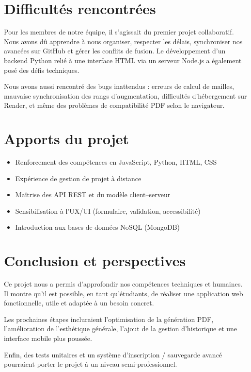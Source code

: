\documentclass{article}
\begin{document}
\section{Difficultés rencontrées}

Pour les membres de notre équipe, il s'agissait du premier projet collaboratif. Nous avons dû apprendre à nous organiser, respecter les délais, synchroniser nos avancées sur GitHub et gérer les conflits de fusion. Le développement d'un backend Python relié à une interface HTML via un serveur Node.js a également posé des défis techniques.

Nous avons aussi rencontré des bugs inattendus : erreurs de calcul de mailles, mauvaise synchronisation des rangs d'augmentation, difficultés d'hébergement sur Render, et même des problèmes de compatibilité PDF selon le navigateur.

\section{Apports du projet}
\begin{itemize}
    \item Renforcement des compétences en JavaScript, Python, HTML, CSS
    \item Expérience de gestion de projet à distance
    \item Maîtrise des API REST et du modèle client–serveur
    \item Sensibilisation à l'UX/UI (formulaire, validation, accessibilité)
    \item Introduction aux bases de données NoSQL (MongoDB)
\end{itemize}

\section{Conclusion et perspectives}

Ce projet nous a permis d'approfondir nos compétences techniques et humaines. Il montre qu'il est possible, en tant qu'étudiants, de réaliser une application web fonctionnelle, utile et adaptée à un besoin concret.

Les prochaines étapes incluraient l'optimisation de la génération PDF, l'amélioration de l'esthétique générale, l'ajout de la gestion d'historique et une interface mobile plus poussée.

Enfin, des tests unitaires et un système d'inscription / sauvegarde avancé pourraient porter le projet à un niveau semi-professionnel.
\end{document}
